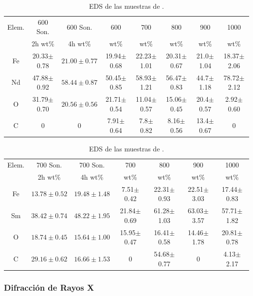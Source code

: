 \documentclass[../main.tex]{subfiles}
\begin{document}
\begin{table}[H]
    \begin{tabular}{|c||c|c|c|c|c|c|c|}
        \hline
        Elem. &600\gradoC{} Son.&600\gradoC{} Son.&600\gradoC{}&700\gradoC{}&800\gradoC{}&900\gradoC{}&1000\gradoC{}\\
        &2h wt\%&4h wt\%&wt\%&wt\%&wt\%&wt\%&wt\%\\
        \hline\hline
        Fe & 20.33$\pm$0.78 &$21.00\pm0.77$& 19.94$\pm$0.68 & 22.23$\pm$1.01 & 20.31$\pm$0.67 & 21.0$\pm$1.04 & 18.37$\pm$2.06 \\
        Nd & 47.88$\pm$0.92 &$58.44\pm0.87$& 50.45$\pm$0.85 & 58.93$\pm$1.21 & 56.47$\pm$0.83 & 44.7$\pm$1.18 & 78.72$\pm$2.12 \\
        O & 31.79$\pm$0.70 &$20.56\pm0.56$& 21.71$\pm$0.54 & 11.04$\pm$0.57 & 15.06$\pm$0.45 & 20.4$\pm$0.57 & 2.92$\pm$0.60 \\
        C & 0 & 0 & 7.91$\pm$0.64 & 7.8$\pm$0.82 & 8.16$\pm$0.56 & 13.4$\pm$0.67 &0 \\ 
        \hline
        \end{tabular} 
            \caption{EDS de las muestras de \neod{}.}
            \label{tab:EDSNd}
        \end{table}
        \begin{table}[H]
            \centering
        \begin{tabular}{|c||c|c|c|c|c|c|}
        \hline
        Elem. &700\gradoC{} Son.&700\gradoC{} Son.&700\gradoC{}&800\gradoC{}&900\gradoC{}&1000\gradoC{}\\
        &2h wt\%&4h wt\%&wt\%&wt\%&wt\%&wt\%\\
        \hline\hline
        Fe &$13.78\pm0.52$&$19.48\pm1.48$& 7.51$\pm$0.42 & 22.31$\pm$0.93 & 22.51$\pm$3.03 & 17.44$\pm$0.83 \\
        Sm &$38.42\pm0.74$&$48.22\pm1.95$& 21.84$\pm$0.69 & 61.28$\pm$1.03 & 63.03$\pm$3.57 & 57.71$\pm$1.82 \\
        O &$18.74\pm0.45$&$15.64\pm1.00$& 15.95$\pm$0.47 & 16.41$\pm$0.58 & 14.46$\pm$1.78 & 20.81$\pm$0.78 \\
        C &$29.16\pm0.62$&$16.66\pm1.53$& 0 & 54.68$\pm$0.77 & 0 & 4.13$\pm$2.17 \\ 
        \hline
        \end{tabular} 
            \caption{EDS de las muestras de \sama{}.}
            \label{tab:EDSSm}
\end{table}

\subsubsection{Difracción de Rayos X} \label{sec:analisisDRX}
\end{document}
